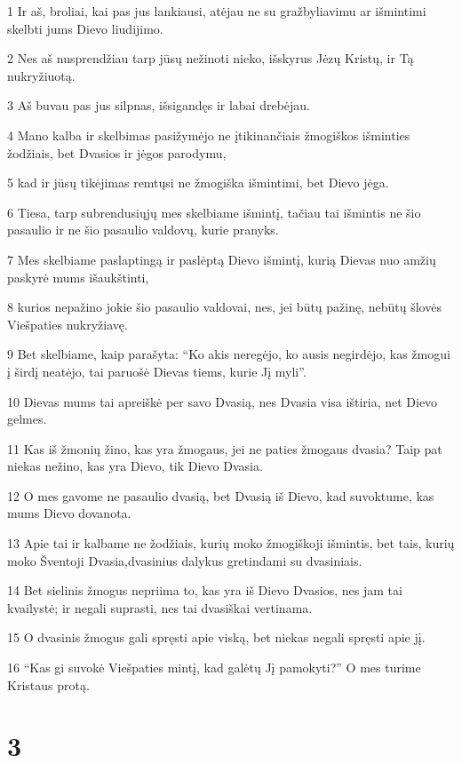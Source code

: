 \par 1 Ir aš, broliai, kai pas jus lankiausi, atėjau ne su gražbyliavimu ar išmintimi skelbti jums Dievo liudijimo. 
\par 2 Nes aš nusprendžiau tarp jūsų nežinoti nieko, išskyrus Jėzų Kristų, ir Tą nukryžiuotą. 
\par 3 Aš buvau pas jus silpnas, išsigandęs ir labai drebėjau. 
\par 4 Mano kalba ir skelbimas pasižymėjo ne įtikinančiais žmogiškos išminties žodžiais, bet Dvasios ir jėgos parodymu, 
\par 5 kad ir jūsų tikėjimas remtųsi ne žmogiška išmintimi, bet Dievo jėga. 
\par 6 Tiesa, tarp subrendusiųjų mes skelbiame išmintį, tačiau tai išmintis ne šio pasaulio ir ne šio pasaulio valdovų, kurie pranyks. 
\par 7 Mes skelbiame paslaptingą ir paslėptą Dievo išmintį, kurią Dievas nuo amžių paskyrė mums išaukštinti, 
\par 8 kurios nepažino jokie šio pasaulio valdovai, nes, jei būtų pažinę, nebūtų šlovės Viešpaties nukryžiavę. 
\par 9 Bet skelbiame, kaip parašyta: “Ko akis neregėjo, ko ausis negirdėjo, kas žmogui į širdį neatėjo, tai paruošė Dievas tiems, kurie Jį myli”. 
\par 10 Dievas mums tai apreiškė per savo Dvasią, nes Dvasia visa ištiria, net Dievo gelmes. 
\par 11 Kas iš žmonių žino, kas yra žmogaus, jei ne paties žmogaus dvasia? Taip pat niekas nežino, kas yra Dievo, tik Dievo Dvasia. 
\par 12 O mes gavome ne pasaulio dvasią, bet Dvasią iš Dievo, kad suvoktume, kas mums Dievo dovanota. 
\par 13 Apie tai ir kalbame ne žodžiais, kurių moko žmogiškoji išmintis, bet tais, kurių moko Šventoji Dvasia,­dvasinius dalykus gretindami su dvasiniais. 
\par 14 Bet sielinis žmogus nepriima to, kas yra iš Dievo Dvasios, nes jam tai kvailystė; ir negali suprasti, nes tai dvasiškai vertinama. 
\par 15 O dvasinis žmogus gali spręsti apie viską, bet niekas negali spręsti apie jį. 
\par 16 “Kas gi suvokė Viešpaties mintį, kad galėtų Jį pamokyti?” O mes turime Kristaus protą.


\chapter{3}


